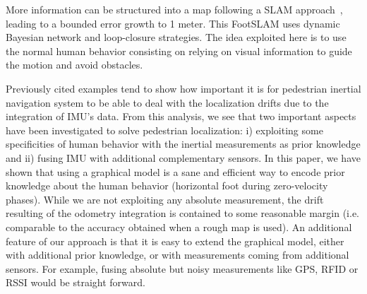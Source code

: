 More information can be structured into a map following a SLAM approach~\cite{angermann2012footslam}, leading to a bounded error growth to 1 meter. This FootSLAM uses dynamic Bayesian network and loop-closure strategies.
The idea exploited here is to use the normal human behavior 
consisting on relying on visual information to guide the motion and avoid obstacles.

Previously cited examples tend to show how important it is for pedestrian inertial navigation system to be able to deal with the localization drifts due to the integration of IMU's data. 
From this analysis, we see that two important aspects have been investigated to solve pedestrian localization: i) exploiting some specificities of human behavior with the inertial measurements as prior knowledge and ii) fusing IMU with additional complementary sensors.
In this paper, we have shown that using a graphical model is a sane and efficient way to encode prior knowledge about the human behavior (horizontal foot during zero-velocity phases).
While we are not exploiting any absolute measurement, the drift resulting of the odometry integration is contained to some reasonable margin (i.e. comparable to the accuracy obtained when a rough map is used).
An additional feature of our approach is that it is easy to extend the graphical model, either with additional prior knowledge, or with measurements coming from additional sensors.
For example, fusing absolute but noisy measurements like GPS, RFID or RSSI would be straight forward.
